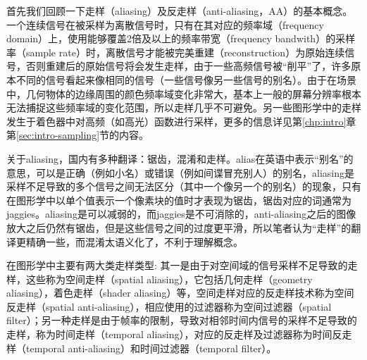 首先我们回顾一下走样（aliasing）及反走样（anti-aliasing，AA）的基本概念。一个连续信号在被采样为离散信号时，只有在其对应的频率域（frequency domain）上，使用能够覆盖2倍及以上的频率带宽（frequency bandwith）的采样率（sample rate）时，离散信号才能被完美重建（reconstruction）为原始连续信号，否则重建后的原始信号将会发生走样，由于一些高频信号被“削平”了，许多原本不同的信号看起来像相同的信号（一些信号像另一些信号的别名）。由于在场景中，几何物体的边缘周围的颜色频率域变化非常大，基本上一般的屏幕分辨率根本无法捕捉这些频率域的变化范围，所以走样几乎不可避免。另一些图形学中的走样发生于着色器中对高频（如高光）函数进行采样，更多的信息详见第\ref{chp:intro}章第\ref{sec:intro-sampling}节的内容。

\begin{shaded*}
	关于aliasing，国内有多种翻译：锯齿，混淆和走样。alias在英语中表示“别名”的意思，可以是正确（例如小名）或错误（例如间谍冒充别人）的别名，aliasing是采样不足导致的多个信号之间无法区分（其中一个像另一个的别名）的现象，只有在图形学中以单个值表示一个像素块的值时才表现为锯齿，锯齿对应的词通常为jaggies。aliasing是可以减弱的，而jaggies是不可消除的，anti-aliasing之后的图像放大之后仍然有锯齿，但是这些信号之间的过度更平滑，所以笔者认为“走样”的翻译更精确一些，而混淆太语义化了，不利于理解概念。
\end{shaded*}

在图形学中主要有两大类走样类型: 其一是由于对空间域的信号采样不足导致的走样，这些称为空间走样（spatial aliasing），它包括几何走样（geometry aliasing），着色走样（shader aliasing）等，空间走样对应的反走样技术称为空间反走样（spatial anti-aliasing），相应使用的过滤器称为空间过滤器（spatial filter）；另一种走样是由于帧率的限制，导致对相邻时间内信号的采样不足导致的走样，称为时间走样（temporal aliasing），对应的反走样及过滤器称为时间反走样（temporal anti-aliasing）和时间过滤器（temporal filter）。

